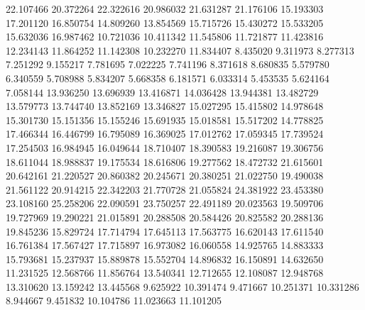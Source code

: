 22.107466
20.372264
22.322616
20.986032
21.631287
21.176106
15.193303
17.201120
16.850754
14.809260
13.854569
15.715726
15.430272
15.533205
15.632036
16.987462
10.721036
10.411342
11.545806
11.721877
11.423816
12.234143
11.864252
11.142308
10.232270
11.834407
8.435020
9.311973
8.277313
7.251292
9.155217
7.781695
7.022225
7.741196
8.371618
8.680835
5.579780
6.340559
5.708988
5.834207
5.668358
6.181571
6.033314
5.453535
5.624164
7.058144
13.936250
13.696939
13.416871
14.036428
13.944381
13.482729
13.579773
13.744740
13.852169
13.346827
15.027295
15.415802
14.978648
15.301730
15.151356
15.155246
15.691935
15.018581
15.517202
14.778825
17.466344
16.446799
16.795089
16.369025
17.012762
17.059345
17.739524
17.254503
16.984945
16.049644
18.710407
18.390583
19.216087
19.306756
18.611044
18.988837
19.175534
18.616806
19.277562
18.472732
21.615601
20.642161
21.220527
20.860382
20.245671
20.380251
21.022750
19.490038
21.561122
20.914215
22.342203
21.770728
21.055824
24.381922
23.453380
23.108160
25.258206
22.090591
23.750257
22.491189
20.023563
19.509706
19.727969
19.290221
21.015891
20.288508
20.584426
20.825582
20.288136
19.845236
15.829724
17.714794
17.645113
17.563775
16.620143
17.611540
16.761384
17.567427
17.715897
16.973082
16.060558
14.925765
14.883333
15.793681
15.237937
15.889878
15.552704
14.896832
16.150891
14.632650
11.231525
12.568766
11.856764
13.540341
12.712655
12.108087
12.948768
13.310620
13.159242
13.445568
9.625922
10.391474
9.471667
10.251371
10.331286
8.944667
9.451832
10.104786
11.023663
11.101205
